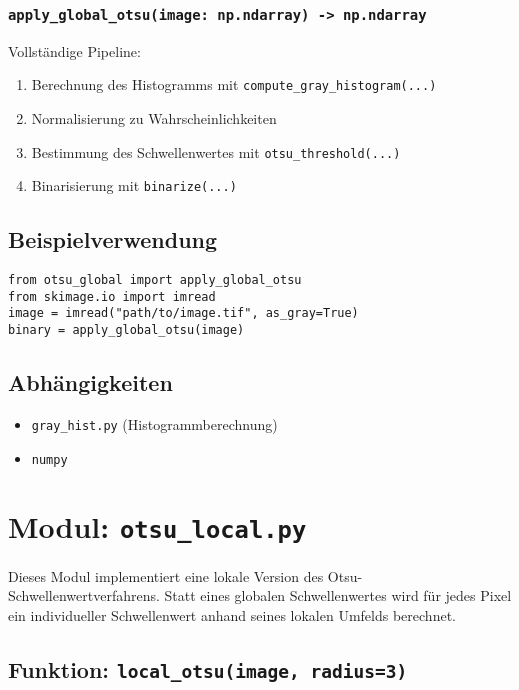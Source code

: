 \documentclass[a4paper,12pt]{article}
\begin{document}
\subsubsection*{\texttt{apply\_global\_otsu(image: np.ndarray) -> np.ndarray}}

Vollständige Pipeline:
\begin{enumerate}
  \item Berechnung des Histogramms mit \texttt{compute\_gray\_histogram(...)}
  \item Normalisierung zu Wahrscheinlichkeiten
  \item Bestimmung des Schwellenwertes mit \texttt{otsu\_threshold(...)}
  \item Binarisierung mit \texttt{binarize(...)}
\end{enumerate}

\subsection*{Beispielverwendung}

\begin{verbatim}
from otsu_global import apply_global_otsu
from skimage.io import imread
image = imread("path/to/image.tif", as_gray=True)
binary = apply_global_otsu(image)
\end{verbatim}

\subsection*{Abhängigkeiten}
\begin{itemize}
  \item \texttt{gray\_hist.py} (Histogrammberechnung)
  \item \texttt{numpy}
\end{itemize}

\section{Modul: \texttt{otsu\_local.py}}

Dieses Modul implementiert eine lokale Version des Otsu-Schwellenwertverfahrens. Statt eines globalen Schwellenwertes wird für jedes Pixel ein individueller Schwellenwert anhand seines lokalen Umfelds berechnet.

\subsection*{Funktion: \texttt{local\_otsu(image, radius=3)}}
\end{document}
